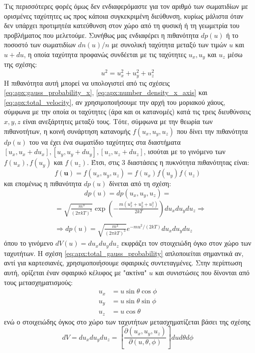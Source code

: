 Τις περισσότερες φορές όμως δεν ενδιαφερόμαστε για τον αριθμό των σωματιδίων με ορισμένες ταχύτητες ως προς κάποια συγκεκριμένη διεύθυνση, κυρίως μάλιστα όταν δεν υπάρχει προτιμητέα κατεύθυνση στον χώρο από τη φυσική ή τη γεωμετρία του προβλήματος που μελετούμε. Συνήθως μας ενδιαφέρει η πιθανότητα $dp(u)$ ή το ποσοστό των σωματιδίων $dn(u)/n$ με συνολική ταχύτητα μεταξύ των τιμών $u$ και $u+du$, η οποία ταχύτητα προφανώς συνδέεται με τις ταχύτητες $u_x, u_y$ και $u_z$ μέσω της σχέσης:
\begin{equation}
    \label{eq:apx:total_velocity}
    u^2 = u_x^2 + u_y^2 + u_z^2
\end{equation}
Η πιθανότητα αυτή μπορεί να υπολογιστεί από τις σχέσεις \eqref{eq:apx:gauss_probability_x}, \eqref{eq:apx:number_density_x_axis} και \eqref{eq:apx:total_velocity}, αν χρησιμοποιήσουμε την αρχή του μοριακού χάους, σύμφωνα με την οποία οι ταχύτητες (άρα και οι κατανομές) κατά τις τρεις διευθύνσεις $x,y,z$ είναι ανεξάρτητες μεταξύ τους. Τότε, σύμφωνα με την θεωρία των πιθανοτήτων, η κοινή συνάρτηση κατανομής $f(u_x, u_y, u_z) $ που δίνει την πιθανότητα $dp(u)$ του να έχει ένα σωματίδιο ταχύτητες στα διαστήματα $[u_x, u_x + du_x], [u_y, u_y + du_y], [u_z, u_z + du_z]$, ισούται με το γινόμενο των $f(u_x), f(u_y)$ και $f(u_z)$. Έτσι, στις 3 διαστάσεις η πυκνότητα πιθανότητας είναι:
\begin{equation}
    \label{eq:apx:common_gauss_distribution}
    f(\boldsymbol{u}) = f(u_x, u_y, u_z) = f(u_x)f(u_y)f(u_z)
\end{equation}
και επομένως η πιθανότητα $dp(u)$ δίνεται από τη σχέση:
$$dp(u) = dp(u_x,u_y,u_z) =$$
\begin{align}
    \label{eq:apx:total_gauss_probability}
  \nonumber &= \sqrt{\frac{m^3}{(2 \pi kT)^3}} \exp \left(- \frac{m(u_x^2 + u_y^2 + u_z^2)}{2kT} \right) du_x du_y du_z \Rightarrow \\ \nonumber \\
    &\Rightarrow dp(u) = \sqrt{\frac{m^3}{(2 \pi kT)^3}} e^{- mu^2/(2kT)} du_x du_y du_z
\end{align}
όπου το γινόμενο $dV(u) = du_x du_y du_z$ εκφράζει τον στοιχειώδη όγκο στον χώρο των ταχυτήτων. Η σχέση \eqref{eq:apx:total_gauss_probability} απλοποιείται σημαντικά αν, αντί για καρτεσιανές, χρησιμοποιήσουμε σφαιρικές συντεταγμένες. Στην περίπτωση αυτή, ορίζεται έναν σφαιρικό κέλυφος με "ακτίνα" $u$ και συνιστώσες που δίνονται από τους μετασχηματισμούς:
\begin{align*}
    u_x & = u \sin{\theta} \cos{\phi} \\
    u_y & = u \sin{\theta} \sin{\phi} \\
    u_z & = u \cos{\theta}
\end{align*}
ενώ ο στοιχειώδης όγκος στο χώρο των ταχυτήτων μετασχηματίζεται βάσει της σχέσης $$dV = du_x du_y du_z = \left[ \frac{\partial (u_x, u_y, u_z)}{\partial (u, \theta, \phi)} \right] du d\theta d\phi$$

